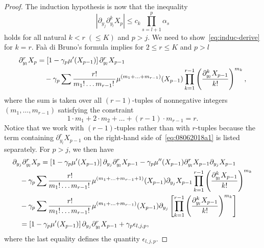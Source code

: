 \documentclass[article]{elsarticle}
\begin{document}
\begin{proof}
The induction hypothesis is now that the inequality
\begin{equation}\label{eq:induc-derive}
\left|\partial_{y_{j}}\partial_{y_{l}}^{k}X_{p}\right|
\leq c_{k}\prod_{s=l+1}^{p}\alpha_{s}
\end{equation}
holds for all natural $k<r\;(\le K)$ and $p>j$.
We need to show~\eqref{eq:induc-derive} for $k=r$.
Fa\`a di Bruno's formula implies for $2\le r\le K$ and $p>l$
\begin{align}
\partial_{y_{l}}^{r}X_{p}
&=\left[1-\gamma_{p}\mu'(X_{p-1})\right]\partial_{y_{l}}^{r}X_{p-1}
\label{eq:08062018a1}\\
&\hspace{1em}-\gamma_{p}\sum\frac{r!}{m_{1}!\ldots m_{r-1}!\,}\mu^{(m_{1}+\ldots+m_{r-1})}(X_{p-1})\prod_{k=1}^{r-1}\left(\frac{\partial_{y_{l}}^{k}X_{p-1}}{k!}\right)^{m_{k}},
\notag
\end{align}
where the sum is taken over all $(r-1)$-tuples of nonnegative integers
$(m_{1},\ldots,m_{r-1})$ satisfying the constraint
\begin{equation}\label{eq:09062018a1}
1\cdot m_{1}+2\cdot m_{2}+\ldots+(r-1)\cdot m_{r-1}=r.
\end{equation}
Notice that we work with $(r-1)$-tuples
rather than with $r$-tuples
because the term containing
$\partial_{y_l}^r X_{p-1}$
on the right-hand side of~\eqref{eq:08062018a1}
is listed separately.
For $p>j$, we then have
\begin{align}
&\partial_{y_{j}}\partial_{y_{l}}^{r}X_{p}
=\left[1-\gamma_{p}\mu'(X_{p-1})\right]\partial_{y_{j}}\partial_{y_{l}}^{r}X_{p-1}-\gamma_{p}\mu''(X_{p-1})\partial_{y_{l}}^{r}X_{p-1}\partial_{y_{j}}X_{p-1}
\label{eq:09062018a2}\\
&\hspace{1em}-\gamma_{p}\sum\frac{r!}{m_{1}!\ldots m_{r-1}!\,}\mu^{(m_{1}+\ldots+m_{r-1}+1)}(X_{p-1})\partial_{y_{j}}X_{p-1}\prod_{k=1}^{r-1}\left(\frac{\partial_{y_{l}}^{k}X_{p-1}}{k!}\right)^{m_{k}}
\notag\\
&\hspace{1em}-\gamma_{p}\sum\frac{r!}{m_{1}!\ldots m_{r-1}!\,}\mu^{(m_{1}+\ldots+m_{r-1})}(X_{p-1})\partial_{y_{j}}\left[\prod_{k=1}^{r-1}\left(\frac{\partial_{y_{l}}^{k}X_{p-1}}{k!}\right)^{m_{k}}\right]
\notag\\
&\hspace{1em} =\left[1-\gamma_{p}\mu'(X_{p-1})\right]\partial_{y_{j}}\partial_{y_{l}}^{r}X_{p-1}+\gamma_{p}\epsilon_{l,j,p},
\notag
\end{align}
where the last equality defines the quantity $\epsilon_{l,j,p}$.

\end{proof}
\end{document}
